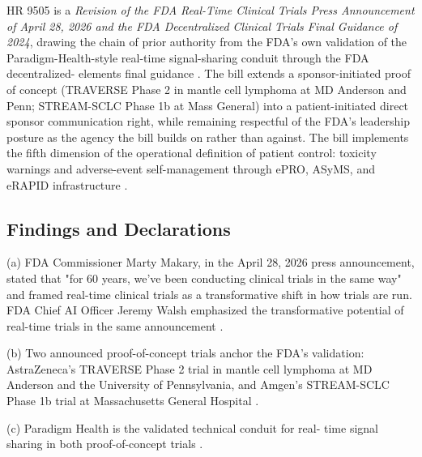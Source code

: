 
HR 9505 is a \textit{Revision of the FDA Real-Time Clinical Trials
Press Announcement of April 28, 2026 and the FDA Decentralized
Clinical Trials Final Guidance of 2024}, drawing the chain of prior
authority from the FDA's own validation of the Paradigm-Health-style
real-time signal-sharing conduit through the FDA decentralized-
elements final guidance \cite{fda_rtct_press_2026,
fda_dct_guidance_2024, fda_dhts_drug_development_2026}. The bill
extends a sponsor-initiated proof of concept (TRAVERSE Phase 2 in
mantle cell lymphoma at MD Anderson and Penn; STREAM-SCLC Phase 1b
at Mass General) into a patient-initiated direct sponsor
communication right, while remaining respectful of the FDA's
leadership posture as the agency the bill builds on rather than
against. The bill implements the fifth dimension of the operational
definition of patient control: toxicity warnings and adverse-event
self-management through ePRO, ASyMS, and eRAPID infrastructure
\cite{rocque2025remote_symptom_monitoring, kearney2009asyms,
maguire2017esmart, absolom2021erapid}.

\subsection{Findings and Declarations}

(a) FDA Commissioner Marty Makary, in the April 28, 2026 press
announcement, stated that "for 60 years, we've been conducting
clinical trials in the same way" and framed real-time clinical
trials as a transformative shift in how trials are run. FDA Chief
AI Officer Jeremy Walsh emphasized the transformative potential of
real-time trials in the same announcement
\cite{fda_rtct_press_2026}.

(b) Two announced proof-of-concept trials anchor the FDA's
validation: AstraZeneca's TRAVERSE Phase 2 trial in mantle cell
lymphoma at MD Anderson and the University of Pennsylvania, and
Amgen's STREAM-SCLC Phase 1b trial at Massachusetts General
Hospital \cite{fda_rtct_press_2026}.

(c) Paradigm Health is the validated technical conduit for real-
time signal sharing in both proof-of-concept trials
\cite{fda_rtct_press_2026}.

